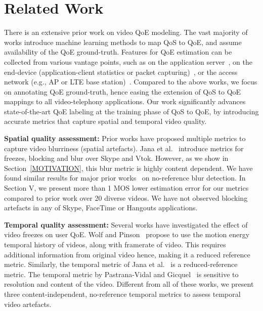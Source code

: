 \section{Related Work}
There is an extensive prior work on video QoE modeling. The vast majority of works \cite{aggarwal2014prometheus,balachandran2013developing,fiedler2010generic} introduce machine learning methods to map QoS to QoE, and assume availability of the QoE ground-truth. Features for QoE estimation can be collected from various vantage points, such as on the application server~\cite{balachandran2013developing}, on the end-device (application-client statistics or packet capturing)~\cite{zhang2012profiling,yu2014can,seufert2015survey,aggarwal2014prometheus,balachandran2012quest,chen2014qoe}, or the access network (e.g., \wifi AP or LTE base station)~\cite{chakraborty2016exbox,jana2016qoe,chen2006quantifying}. Compared to the above works, we focus on annotating QoE ground-truth, hence easing the extension of QoS to QoE mappings to all video-telephony applications. Our work significantly advances state-of-the-art QoE labeling at the training phase of QoS to QoE, by introducing accurate metrics that capture spatial and temporal video quality.

\noindent
\textbf{Spatial quality assessment:}  Prior works have proposed multiple metrics to capture video blurriness (spatial artefacts). Jana et al.~\cite{jana2016qoe} introduce metrics for freezes, blocking and blur over Skype and Vtok. However, as we show in Section~\ref{MOTIVATION}, this blur metric is highly content dependent. We have found similar results for major prior works~\cite{golestaneh2014no, mittal2012no,tong2004blur,marziliano2002no} on no-reference blur detection. In Section V, we present more than 1 MOS lower estimation error for our metrics compared to prior work over 20 diverse videos. We have not observed blocking artefacts in any of Skype, FaceTime or Hangouts applications.

\noindent
\textbf{Temporal quality assessment:} Several works \cite{wolf2009no, borer2010model, usman2017no, pastrana2006automatic} have investigated the effect of video freezes on user QoE. Wolf and Pinson~\cite{wolf2009no} propose to use the motion energy temporal history of videos, along with framerate of video. This requires additional information from original video hence, making it a reduced reference metric. Similarly, the temporal metric of Jana et al.~\cite{jana2016qoe} is a reduced-reference metric. The temporal metric by Pastrana-Vidal and Gicquel~\cite{pastrana2006automatic} is sensitive to resolution and content of the video. Different from all of these works, we present three content-independent, no-reference temporal metrics to assess temporal video artefacts.
